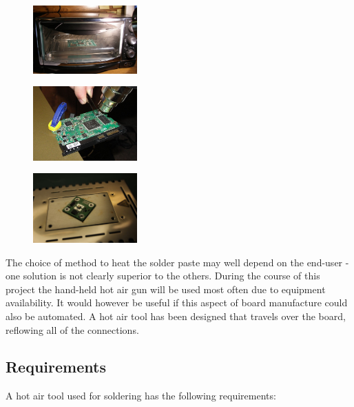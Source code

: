 \begin{figure}
\centering
\begin{minipage}{.3\textwidth}
	\centering
	\includegraphics[width=40mm]{resources/boardintheoven.jpg}
	\label{toasteroven}
\end{minipage}%
\hfill
\begin{minipage}{.3\textwidth}
	\centering
	\includegraphics[width=40mm]{resources/hotair_demo.jpg}
	\label{hotairdemo}
\end{minipage}%
\hfill
\begin{minipage}{.3\textwidth}
	\centering
	\includegraphics[width=40mm]{resources/hotplate.jpg}
	\label{hotplate}
\end{minipage}
\end{figure}	
			
The choice of method to heat the solder paste may well depend on the end-user - one solution is not clearly superior to the others. During the
course of this project the hand-held hot air gun will be used most often due to equipment availability. It would however
be useful if this aspect of board manufacture could also be automated.
A hot air tool has been designed that travels over the board, reflowing
all of the connections.

\subsection{Requirements}
A hot air tool used for soldering has the following requirements:

